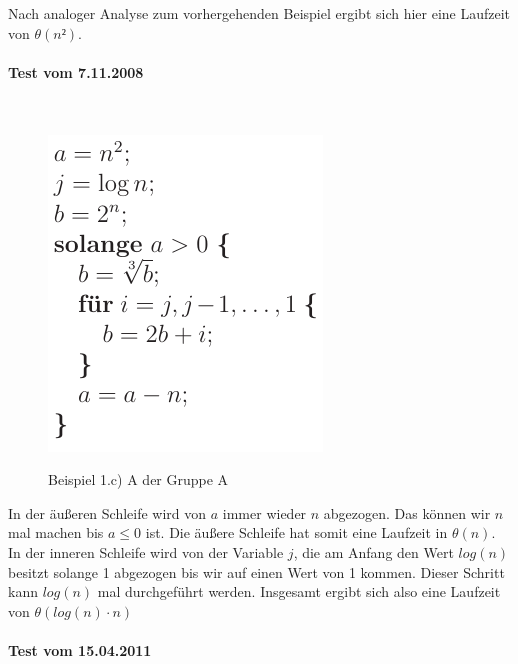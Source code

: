 \documentclass[a4paper, 12pt]{article}
\begin{document}
Nach analoger Analyse zum vorhergehenden Beispiel ergibt sich hier eine Laufzeit von $θ\left(n²\right)$.

\paragraph{Test vom 7.11.2008}~\\

\begin{figure}[H]
	\caption{Beispiel 1.c) A der Gruppe A}
	\vskip 0.2cm
	\centering
	\includegraphics{Figures/Test_2008-11-07_1AcA}
	\label{figure:Test_2008-11-07_1AcA}
\end{figure}

In der äußeren Schleife wird von $a$ immer wieder $n$ abgezogen. Das können wir $n$ mal machen bis $a≤0$ ist. Die äußere Schleife hat somit eine Laufzeit in $θ\left(n\right)$. In der inneren Schleife wird von der Variable $j$, die am Anfang den Wert $log\left(n\right)$ besitzt solange 1 abgezogen bis wir auf einen Wert von 1 kommen. Dieser Schritt kann $log\left(n\right)$ mal durchgeführt werden. Insgesamt ergibt sich also eine Laufzeit von $θ\left(log\left(n\right)⋅ n\right)$

\paragraph{Test vom 15.04.2011}~\\
\end{document}
